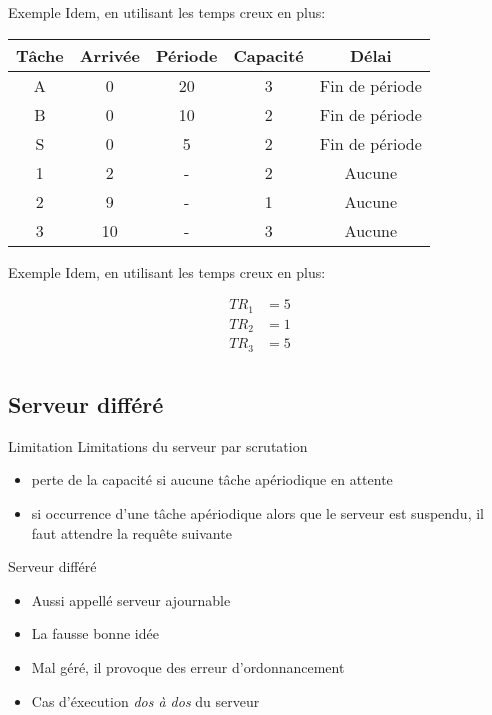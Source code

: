 \begin{frame}{Exemple}
  Idem, en utilisant les temps creux en plus:
  \begin{center}
    \begin{tabular}{ccccc}
      \hline
      Tâche & Arrivée & Période & Capacité & Délai \\
      \hline
      A &  0 & 20 & 3 & Fin de période\\
      B &  0 & 10 & 2 & Fin de période\\
      S &  0 &  5 & 2 & Fin de période\\
      1 &  2 &  - & 2 & Aucune\\
      2 &  9 &  - & 1 & Aucune\\
      3 & 10 &  - & 3 & Aucune\\
      \hline
    \end{tabular}
    \pause
    
  \end{center}
\end{frame} 

\begin{frame}{Exemple}
  Idem, en utilisant les temps creux en plus:
  \begin{center}
    
    \begin{align*}
      TR_1 &= 5\\
      TR_2 &= 1\\
      TR_3 &= 5\\
    \end{align*}
  \end{center}
\end{frame} 

\subsection{Serveur différé}

\begin{frame}{Limitation} 
  Limitations du serveur par scrutation 
  \begin{itemize}
  \item perte de la capacité si aucune tâche apériodique en attente
  \item si occurrence d'une tâche apériodique alors que le serveur est
    suspendu, il faut attendre la requête suivante
  \end{itemize}
\end{frame} 

\begin{frame}{Serveur différé}
  \begin{itemize} 
  \item Aussi appellé serveur ajournable
  \item La fausse bonne idée
  \item Mal géré, il provoque des erreur d'ordonnancement
  \item Cas d'éxecution \emph{dos à dos} du serveur
  \end{itemize}
\end{frame}

